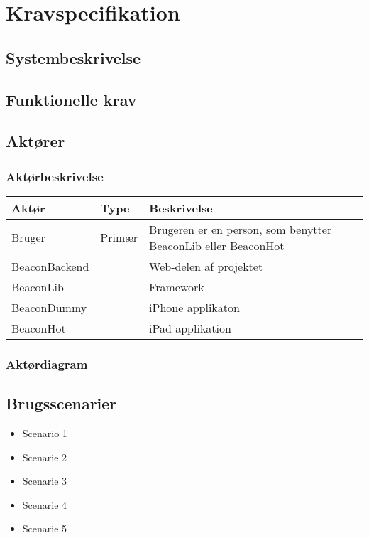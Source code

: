 \chapter{Kravspecifikation}
\label{ch:kravspecifikation}

\section{Systembeskrivelse}

\section{Funktionelle krav}
\section{Aktører}
\subsection{Aktørbeskrivelse}

\begin{table}[h]
\begin{tabular}{@{}lll@{}}
\toprule
\textbf{Aktør} & \textbf{Type} & \textbf{Beskrivelse}                                          \\ \midrule
Bruger         & Primær        & Brugeren er en person, som benytter BeaconLib eller BeaconHot \\ \midrule
BeaconBackend  &               & Web-delen af projektet                                        \\ \midrule
BeaconLib      &               & Framework                                                     \\ \midrule
BeaconDummy    &               & iPhone applikaton                                             \\ \midrule
BeaconHot      &               & iPad applikation                                              \\ \bottomrule
\end{tabular}
\end{table}

\subsection{Aktørdiagram}
\section{Brugsscenarier}
\begin{itemize}
\item Scenario 1 
\item Scenarie 2 
\item Scenarie 3 
\item Scenarie 4 
\item Scenarie 5 
\end{itemize}